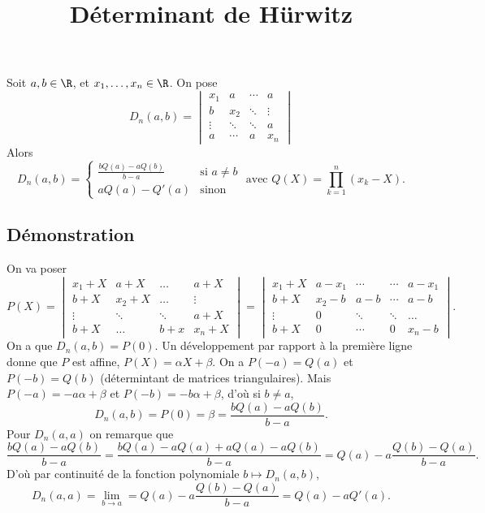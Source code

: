 \documentclass[fontsize=12pt,twoside=false,parskip=half,french]{scrartcl}
\title{Déterminant de Hürwitz}
\date{}
\author{}
\begin{document}
\maketitle
   \begin{Theoreme}
      Soit $a, b \in \R$, et $x_1, \ldots, x_n \in \R$. On pose
      \[
         D_n(a, b) = \begin{vmatrix}
          x_1    & a      & \cdots & a\\
          b      & x_2    & \ddots & \vdots\\
          \vdots & \ddots & \ddots & a\\
          a      & \cdots & a      & x_n
         \end{vmatrix}
      \]
      Alors
      \[
      D_n(a, b) = 
      \begin{cases}
         \frac{bQ(a) - aQ(b)}{b - a} & \text{si $a \neq b$}\\
          aQ(a) - Q'(a) & \text{sinon}
      \end{cases}
      \text{ avec } Q(X) = \prod_{k = 1}^n (x_k - X).
      \]
   \end{Theoreme}
   \subsection{Démonstration}
      On va poser
      \[
         P(X) = 
         \begin{vmatrix}
            x_1 + X & a + X   & \ldots & a + X\\
            b + X   & x_2 + X & \ldots & \vdots\\
            \vdots  & \ddots  & \ddots & a + X\\
            b + X   & \ldots  & b + x  & x_n + X
         \end{vmatrix}
         =
         \begin{vmatrix}
            x_1 + X & a - x_1   & \cdots & \cdots & a - x_1\\
            b + X   & x_2 - b   & a - b  & \cdots & a - b\\
            \vdots  & 0         & \ddots & \ddots & \hdots\\
            b + X   & 0         & \cdots & 0      & x_n - b
         \end{vmatrix}.
      \]
      On a que $D_n(a, b) = P(0)$. Un développement par rapport à la première 
      ligne donne que $P$ est affine, $P(X) = \alpha X + \beta$.
      On a $P(-a) = Q(a)$ et $P(-b) = Q(b)$ (détermintant de matrices 
      triangulaires). Mais $P(-a) = -a\alpha + \beta$ et $P(-b) = -b\alpha + \beta$, d'où
      si $b \neq a$,
      \[
         D_n(a, b) = P(0) = \beta = \frac{bQ(a) - aQ(b)}{b - a}.
      \]
      Pour $D_n(a, a)$ on remarque que
      \[
        \frac{bQ(a) - aQ(b)}{b - a}
        = \frac{bQ(a) - aQ(a) + aQ(a) - aQ(b)}{b - a}
        = Q(a) - a\frac{Q(b) - Q(a)}{b - a}.
      \]
      D'où par continuité de la fonction polynomiale $b \mapsto D_n(a, b)$, 
      \[
        D_n(a, a) = \lim_{b \to a} = Q(a) - a\frac{Q(b) - Q(a)}{b - a} = Q(a) - aQ'(a).
      \]
\end{document}
